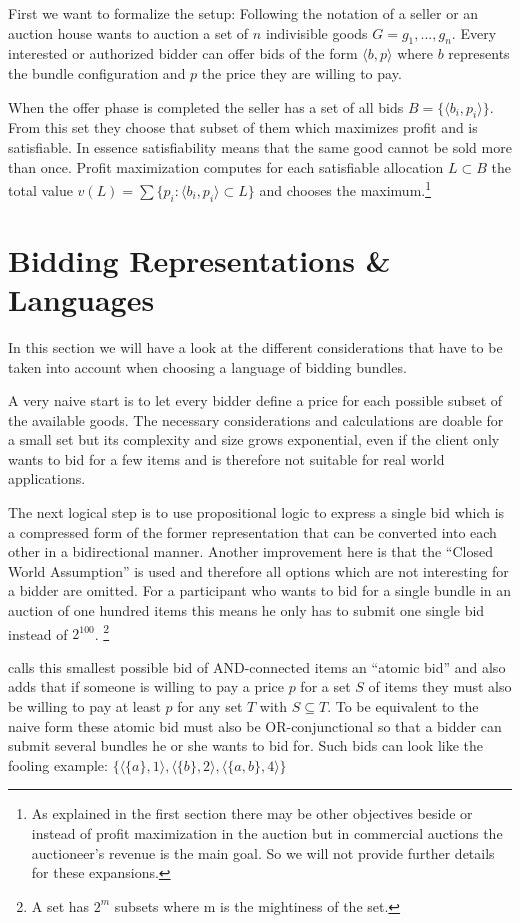 \documentclass[a4paper]{paper}
\begin{document}
First we want to formalize the setup: Following the notation of \cite[chapter~2]{BH01} a seller or an auction house wants to auction a set of $n$ indivisible goods $G = {g_1, ..., g_n}$. Every interested or authorized bidder can offer bids of the form $\langle b, p \rangle$ where $b$ represents the bundle configuration and $p$ the price they are willing to pay.

When the offer phase is completed the seller has a set of all bids $B = \{\langle b_i, p_i \rangle\}$. From this set they choose that subset of them which maximizes profit and is satisfiable. In essence satisfiability means that the same good cannot be sold more than once. Profit maximization computes for each satisfiable allocation $L \subset B$ the total value $v(L) = \sum \{p_i : \langle b_i, p_i \rangle  \subset L\}$ and chooses the maximum.\footnote{As explained in the first section there may be other objectives beside or instead of profit maximization in the auction but in commercial auctions the auctioneer's revenue is the main goal. So we will not provide further details for these expansions.}

\section{Bidding Representations \& Languages}

In this section we will have a look at the different considerations that have to be taken into account when choosing a language of bidding bundles. 

A very naive start is to let every bidder define a price for each possible subset of the available goods. The necessary considerations and calculations are doable for a small set but its complexity and size grows exponential, even if the client only wants to bid for a few items and is therefore not suitable for real world applications.

The next logical step is to use propositional logic to express a single bid which is a compressed form of the former representation that can be converted into each other in a bidirectional manner. Another improvement here is that the ``Closed World Assumption'' is used and therefore all options which are not interesting for a bidder are omitted. For a participant who wants to bid for a single bundle in an auction of one hundred items this means he only has to submit one single bid instead of $2^{100}$. \footnote{A set has $2^m$ subsets where m is the mightiness of the set.}

\cite{Nis00} calls this smallest possible bid of AND-connected items an ``atomic bid'' and also adds that if someone is willing to pay a price $p$ for a set $S$ of items they must also be willing to pay at least $p$ for any set $T$ with $S \subseteq T$. To be equivalent to the naive form these atomic bid must also be OR-conjunctional so that a bidder can submit several bundles he or she wants to bid for. Such bids can look like the fooling example: $\{ \langle \{a\}, 1 \rangle, \langle \{b\}, 2 \rangle, \langle \{a,b\},4 \rangle \}$
\end{document}
